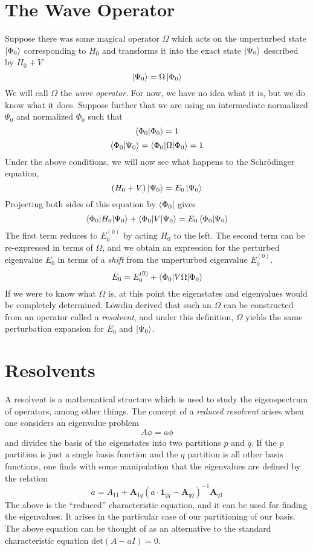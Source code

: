 \documentclass{article}
\newcommand{\Ezero}{E^{(0)}}
\begin{document}
\section{The Wave Operator}
Suppose there was some magical operator $\Omega$ which
acts on the unperturbed state $\ket{\Phi_0}$ corresponding to $H_0$ 
and transforms it into the exact state $\ket{\Psi_0}$ described by $H_0 + V$
\[\ket{\Psi_0} = \Omega \ket{\Phi_0} \]
We will call $\Omega$ the \textit{wave operator}.
For now, we have no idea what it is, but we do know what it does.
Suppose further that we are using an intermediate normalized $\Psi_0$ and normalized $\Phi_0$ such that
\[ \braket{\Phi_0|\Phi_0} = 1 \]
\[ \braket{\Phi_0 | \Psi_0} = \braket{\Phi_0 | \Omega | \Phi_0} = 1 \]
Under the above conditions, we will now see what happens to the Schr{\"o}dinger equation,
\[(H_0 + V) \ket{\Psi_0} = E_0 \ket{\Psi_0} \]
Projecting both sides of this equation by $\bra{\Phi_0}$ gives
\[\braket{\Phi_0 | H_0 | \Psi_0} + \braket{\Phi_0 | V | \Psi_0} = E_0 \braket{\Phi_0|\Psi_0} \]
The first term reduces to $\Ezero_0$ by acting $H_0$ to the left. The second term 
can be re-expressed in terms of $\Omega$, and we obtain an expression for the 
perturbed eigenvalue $E_0$ in terms of a \textit{shift} from the unperturbed eigenvalue $\Ezero_0$.  
\[ E_0 = \Ezero_0 + \braket{\Phi_0 | V \Omega | \Phi_0}  \]
If we were to know what $\Omega$ is, at this point the eigenstates and eigenvalues would be completely
determined.
L{\"o}wdin derived that such an $\Omega$ can be constructed from an operator called a \textit{resolvent},
and under this definition, $\Omega$ yields the same perturbation expansion for $E_0$ and $\ket{\Psi_0}$.

\section{Resolvents}
A resolvent is a mathematical structure which is used to study the eigenspectrum
of operators, among other things.
The concept of a \textit{reduced resolvent} arises when one considers an eigenvalue problem \[A \phi = a \phi \]
and divides the basis of the eigenstates into two partitions $p$ and $q$. 
If the $p$ partition is just a single basis function and the $q$ partition 
    is all other basis functions,
    one finds with some manipulation that the eigenvalues are defined by the relation 
\[ a =  A_{11} + \mathbf{A}_{1q}( a \cdot \mathbf{1}_{qq} - \mathbf{A}_{qq})^{-1} \mathbf{A}_{q1} \]
The above is the ``reduced'' characteristic equation, and it can be used for finding the eigenvalues.
It arises in the particular case of our partitioning of our basis.
The above equation can be thought of as an alternative to the standard characteristic equation $\mathrm{det}(A - aI) = 0$.
\end{document}
